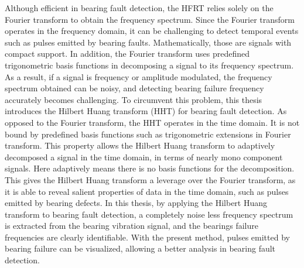 \documentclass[../Main/thesis.tex]{subfiles}
\begin{document}
 Although efficient in bearing fault detection, the HFRT relies solely on the Fourier transform to obtain the frequency spectrum. Since the Fourier transform operates in the frequency domain, it can be challenging to detect temporal events such as pulses emitted by bearing faults. Mathematically, those are signals with compact support. In addition, the Fourier transform uses predefined trigonometric basis functions in decomposing a signal to its frequency spectrum. As a result, if a signal is frequency or amplitude modulated, the frequency spectrum obtained can be noisy, and detecting bearing failure frequency accurately becomes challenging. To circumvent this problem, this thesis introduces the Hilbert Huang transform (HHT) for bearing fault detection. As opposed to the Fourier transform, the HHT operates in the time domain. It is not bound by predefined basis functions such as trigonometric extensions in Fourier transform. This property allows the Hilbert Huang transform to adaptively decomposed a signal in the time domain, in terms of nearly mono component signals. Here adaptively means there is no basis functions for the decomposition. This gives the Hilbert Huang transform a leverage over the Fourier transform, as it is able to reveal salient properties of data in the time domain, such as pulses emitted by bearing defects.
 \justify
 In this thesis, by applying the Hilbert Huang transform to bearing fault detection, a completely noise less frequency spectrum is extracted from the bearing vibration signal, and the bearings failure frequencies are clearly identifiable. With the present method, pulses emitted by bearing failure can be visualized, allowing a better analysis in bearing fault detection.

\vfill\vfill
\clearpage
\blankpage
\end{document}

